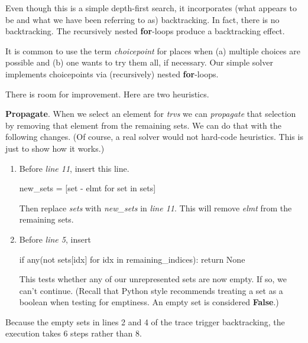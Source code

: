 Even though this is a simple depth-first search, it incorporates (what appears to be and what we have been referring to as) backtracking. In fact, there is no backtracking. The recursively nested \textbf{for}-loops produce a backtracking effect.  

It is common to use the term \textit{choicepoint} for places when (a) multiple choices are possible and (b) one wants to try them all, if necessary. Our simple solver implements choicepoints via (recursively) nested \textbf{for}-loops. 

There is room for improvement. Here are two heuristics. 

\noindent\textbf{Propagate}. When we select an element for \textit{trvs} we can \textit{propagate} that selection by removing that element from the remaining sets. We can do that with the following changes. (Of course, a real solver would not hard-code heuristics. This is just to show how it works.)
\begin{enumerate}
    \item Before \textit{line 11}, insert this line.
  
\begin{minipage}[c]{0.45\textwidth}
\begin{python1}
new_sets = [set - {elmt} for set in sets]
\end{python1}
\end{minipage}

Then replace \textit{sets} with \textit{new\_sets} in \textit{line 11}.
This will remove \textit{elmt} from the remaining sets.

    \item Before \textit{line 5}, insert

\begin{minipage}[c]{0.45\textwidth}
\begin{python1}
if any(not sets[idx] for idx in remaining_indices):
  return None
\end{python1}
\end{minipage}


This tests whether any of our unrepresented sets are now empty. If so, we can't continue. (Recall that Python style recommends treating a set as a boolean when testing for emptiness. An empty set is considered \textbf{False}.)


\end{enumerate}

Because the empty sets in lines 2 and 4 of the trace trigger backtracking, the execution takes 6 steps rather than 8.

